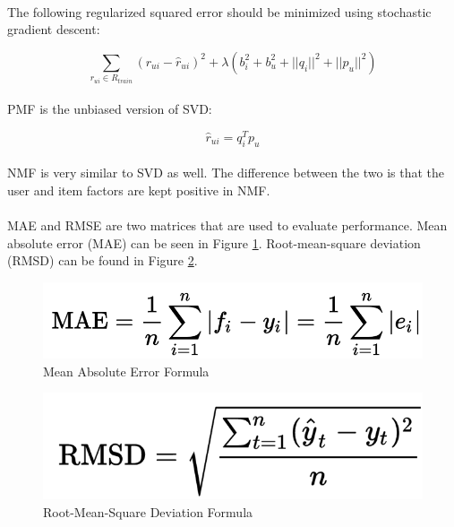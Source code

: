 \documentclass[times]{article}
\begin{document}
		\paragraph{}
		The following regularized squared error should be minimized using stochastic gradient descent:

		\begin{equation*}
		\sum_{r_{ui} \in R_{train}} \left(r_{ui} - \hat{r}_{ui} \right)^2 +
		\lambda\left(b_i^2 + b_u^2 + ||q_i||^2 + ||p_u||^2\right)
		\end{equation*}

		\paragraph{}
		PMF is the unbiased version of SVD:

		\begin{equation*}
		\hat{r}_{ui} = q_i^Tp_u
		\end{equation*}

		\paragraph{}
		NMF is very similar to SVD as well. The difference between the two is that the user and item factors are kept positive in NMF.

		\paragraph{}
		MAE and RMSE are two matrices that are used to evaluate performance. Mean absolute error (MAE) can be seen in Figure \ref{equ:MAE}. Root-mean-square deviation (RMSD) can be found in Figure \ref{equ:RMSD}.


		\begin{figure}
			\includegraphics[width=\linewidth]{MAE}
			\caption{Mean Absolute Error Formula}
			\label{equ:MAE}
		\end{figure}

		\begin{figure}
			\includegraphics[width=\linewidth]{RMSD}
			\caption{Root-Mean-Square Deviation Formula}
			\label{equ:RMSD}
		\end{figure}
\end{document}
